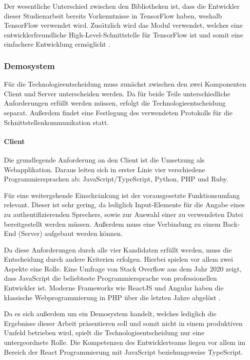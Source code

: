 Der wesentliche Unterschied zwischen den Bibliotheken ist, dass die Entwickler dieser Studienarbeit bereits Vorkenntnisse in TensorFlow haben, weshalb TensorFlow verwendet wird.
Zusätzlich wird das Modul  verwendet, welches eine entwicklerfreundliche High-Level-Schnittstelle für TensorFlow ist und somit eine einfachere Entwicklung ermöglicht \autocite[vgl.][]{noauthor_keras_2023}.

\subsubsection{Demosystem}
Für die Technologieentscheidung muss zunächst zwischen den zwei Komponenten Client und Server unterscheiden werden.
Da für beide Teile unterschiedliche Anforderungen erfüllt werden müssen, erfolgt die Technologieentscheidung separat.
Außerdem findet eine Festlegung des verwendeten Protokolls für die Schnittstellenkommunikation statt.

\paragraph{Client}
Die grundlegende Anforderung an den Client ist die Umsetzung als Webapplikation.
Daraus leiten sich in erster Linie vier verschiedene Programmiersprachen ab: JavaScript/Type\-Script, Python, PHP und Ruby.

Für eine weitergehende Einschränkung ist der vorausgesetzte Funktionsumfang relevant.
Dieser ist sehr gering, da lediglich Input-Elemente für die Angabe eines zu authentifizierenden Sprechers, sowie zur Auswahl einer zu verwendeten Datei bereitgestellt werden müssen.
Außerdem muss eine Verbindung zu einem Back-End (Server) aufgebaut werden können.

Da diese Anforderungen durch alle vier Kandidaten erfüllt werden, muss die Entscheidung durch andere Kriterien erfolgen.
Hierbei spielen vor allem zwei Aspekte eine Rolle.
Eine Umfrage von Stack Overflow aus dem Jahr 2020 zeigt, dass JavaScript die beliebteste Programmiersprache von professionellen Entwickler ist.
Moderne Frameworks wie ReactJS und Angular haben die klassische Webprogrammierung in PHP über die letzten Jahre abgelöst \autocite[vgl.][]{stack_overflow_stack_2020}.

Da es sich außerdem um ein Demosystem handelt, welches lediglich die Ergebnisse dieser Arbeit präsentieren soll und somit nicht in einem produktiven Umfeld betrieben wird, spielt die Technologieentscheidung nur eine untergeordnete Rolle.
Die Kompetenzen des Entwicklerteams liegen vor allem im Bereich der React Programmierung mit JavaScript beziehungsweise TypeScript.

